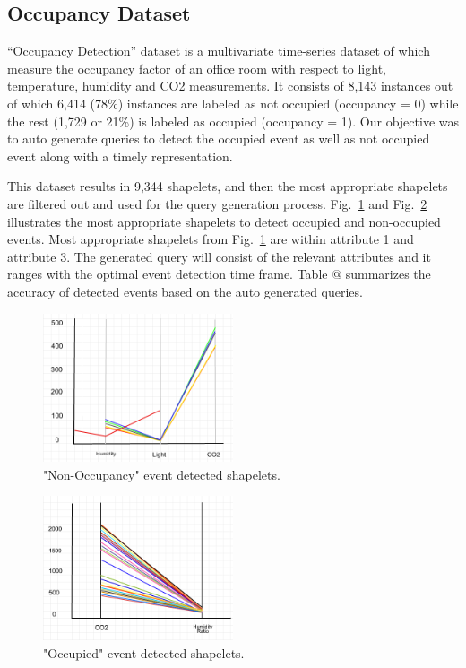 \documentclass[conference]{IEEEtran}  %
\makeatletter
\newcommand*{\rom}[1]{\expandafter\@slowromancap\romannumeral #1@}
\makeatother
\begin{document}
\subsection{Occupancy Dataset} 
“Occupancy Detection” dataset \cite{IEEEexample:Ocupancy} is a multivariate time-series dataset of which measure the occupancy factor of an office room with respect to light, temperature, humidity and CO2 measurements. It consists of 8,143 instances out of which 6,414 (78\%) instances are labeled as not occupied (occupancy = 0) while the rest (1,729 or 21\%) is labeled as occupied (occupancy = 1). Our objective was to auto generate queries to detect the occupied event as well as not occupied event along with a timely representation.

This dataset results in 9,344 shapelets, and then the most appropriate shapelets are filtered out and used for the query generation process. Fig.~\ref{fig:occupancyEvent1} and Fig.~\ref{fig:occupancyEvent2} illustrates the most appropriate shapelets to detect occupied and non-occupied events. Most appropriate shapelets from Fig.~\ref{fig:occupancyEvent1} are within attribute 1 and attribute 3. The generated query will consist of the relevant attributes and it ranges with the optimal event detection time frame. Table \rom{1} summarizes the accuracy of detected events based on the auto generated queries.  


\begin{figure}
\includegraphics[width=0.5\textwidth]{Occupancy_event1.png}
\caption{"Non-Occupancy" event detected shapelets.}
\label{fig:occupancyEvent1}
\end{figure}

\begin{figure}
\includegraphics[width=0.5\textwidth]{Occupancy_event2.png}
\caption{"Occupied" event detected shapelets.}
\label{fig:occupancyEvent2}
\end{figure}
\end{document}
